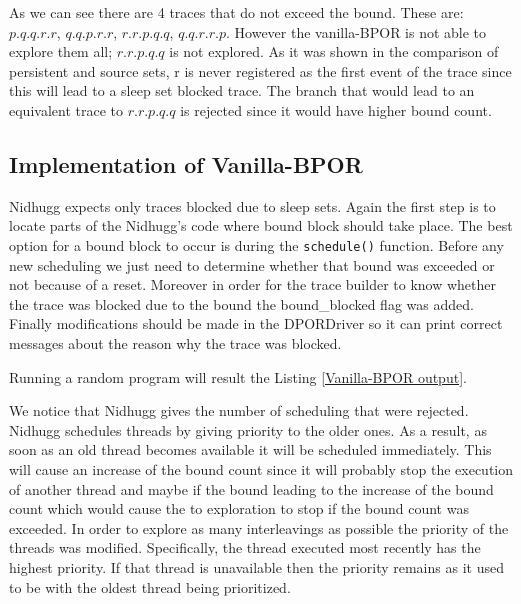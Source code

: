 \label{Vanilla0}    

As we can see there are 4 traces that do not exceed the bound. These are:
$p.q.q.r.r$, $q.q.p.r.r$, $r.r.p.q.q$, $q.q.r.r.p$.
However the vanilla-BPOR is not able to explore them all; $r.r.p.q.q$ is not explored.
As it was shown in the comparison of persistent and source sets, r is never registered as the first event of the trace
since this will lead to a sleep set blocked trace. The branch that would lead to an equivalent trace to $r.r.p.q.q$ is rejected
since it would have higher bound count.

\subsection{Implementation of Vanilla-BPOR}
Nidhugg expects only traces blocked due to sleep sets. Again the first step is to locate parts of the Nidhugg's code where 
bound block should take place. The best option for a bound block to occur is during the \verb|schedule()| function. Before any new scheduling
we just need to determine whether that bound was exceeded or not because of a reset.
Moreover in order for the trace builder to know whether the trace was blocked due to the bound the bound\_blocked flag was added.
Finally modifications should be made in the DPORDriver so it can print correct messages about the reason why the trace was blocked.

Running a random program will result the Listing \ref{Vanilla-BPOR output}.

We notice that Nidhugg gives the number of scheduling that were rejected. Nidhugg schedules threads by giving priority to the older ones. As a result, as 
soon as an old thread becomes available it will be scheduled immediately. This will cause an increase of the bound count since it will probably stop the execution of another thread and maybe if the bound
leading to the increase of the bound count which would cause the to exploration to stop if the bound count was exceeded. In order to explore as many interleavings as possible the priority of the threads was modified.
Specifically, the thread executed most recently has the highest priority. If that thread is unavailable then the priority remains as it 
used to be with the oldest thread being prioritized.



